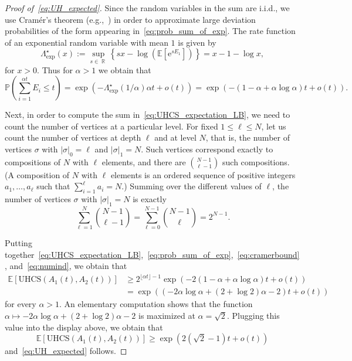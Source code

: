 \documentclass[11pt]{article}
\numberwithin{equation}{section}
\DeclareMathOperator{\R}{\mathbb{R}} %
\newcommand{\E}{\mathbb{E}} %
\newcommand{\UHCS}{\mathrm{UHCS}} %
\newcommand{\prob}[1]{\mathbb{P} \left( #1 \right)}
\newcommand{\be}{\begin{equation}}
\newcommand{\ee}{\end{equation}}
\newcommand{\e}{\mathrm e}
\theoremstyle{definition}
\begin{document}
\begin{proof}[Proof of~\eqref{eq:UH_expected}]
Since the random variables in the sum are i.i.d., we use Cram\'er's theorem (e.g.,~\cite[Theorem~1.4]{hollander2000large}) 
in order to approximate large deviation probabilities of the form appearing in~\eqref{eq:prob_sum_of_exp}. 
The rate function of an exponential random variable with mean $1$ is given by 
\begin{equation}\label{eq:exp_rate_function}
\Lambda^{\star}_{\exp}(x)
:= \sup_{s\in \R}\left\{ sx-\log\left(\mathbb E \left[\e^{s E_1} \right] \right) \right\}
= x - 1 -\log x,
\end{equation}
for $x > 0$. 
Thus for $\alpha > 1$ we obtain that 
\be \label{eq:cramerbound}
\prob{\sum_{i=1}^{\alpha t}E_i\leq t} 
= \exp \left(-\Lambda_{\exp}^{\star}(1/\alpha)\alpha t + o(t) \right)
= \exp \left(-(1-\alpha+\alpha\log\alpha)t + o(t) \right).
\ee 


Next, in order to compute the sum in~\eqref{eq:UHCS_expectation_LB}, we need to count the number of vertices at a particular level. 
For fixed $1 \leq \ell \leq N$, let us count the number of vertices 
at depth $\ell$ 
and at level $N$, 
that is, 
the number of vertices $\sigma$ 
with 
$|\sigma|_{0} = \ell$ 
and 
$|\sigma|_{1} = N$. 
Such vertices correspond exactly to compositions of $N$ with $\ell$ elements, 
and there are $\binom{N-1}{\ell-1}$ such compositions. 
(A composition of $N$ with $\ell$ elements is an ordered sequence of positive integers $a_{1}, \ldots, a_{\ell}$ such that $\sum_{i=1}^{\ell} a_{i} = N$.) 
Summing over the different values of $\ell$, 
the number of vertices $\sigma$ with $|\sigma|_1 = N$ is exactly 
\be \label{eq:numind}
\sum_{\ell=1}^{N}\binom{N-1}{\ell-1}=\sum_{\ell=0}^{N-1}\binom{N-1}{\ell}=2^{N-1}.
\ee 

Putting together~\eqref{eq:UHCS_expectation_LB},~\eqref{eq:prob_sum_of_exp},~\eqref{eq:cramerbound}, and~\eqref{eq:numind}, 
we obtain that 
\begin{align*}
\E \left[ \UHCS(A_{1}(t), A_{2}(t)) \right] 
&\geq 2^{\lfloor \alpha t \rfloor-1} \exp \left(-2(1-\alpha+\alpha\log\alpha)t + o(t) \right) \\
&= \exp \left( \left( - 2 \alpha \log\alpha + (2+\log 2) \alpha - 2 \right) t + o(t) \right)
\end{align*}
for every $\alpha > 1$. 
An elementary computation shows that the function 
$\alpha \mapsto - 2 \alpha \log\alpha + (2+\log 2) \alpha - 2$ 
is maximized at $\alpha = \sqrt{2}$. 
Plugging this value into the display above, we obtain that 
\[
\E \left[ \UHCS(A_{1}(t), A_{2}(t)) \right] 
\geq 
\exp \left( 2 \left( \sqrt{2}-1 \right) t + o(t) \right)
\]
and~\eqref{eq:UH_expected} follows. 
\end{proof} 
\end{document}

